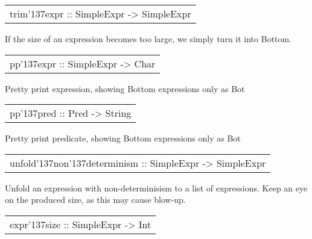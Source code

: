 \begin{haddockdesc}
\item[\begin{tabular}{@{}l}
trim{\char '137}expr :: SimpleExpr -> SimpleExpr
\end{tabular}]
{\haddockbegindoc
If the size of an expression becomes too large, we simply turn it into Bottom.\par}
\end{haddockdesc}
\begin{haddockdesc}
\item[\begin{tabular}{@{}l}
pp{\char '137}expr :: SimpleExpr -> {\char 91}Char{\char 93}
\end{tabular}]
{\haddockbegindoc
Pretty print expression, showing Bottom expressions only as Bot\par}
\end{haddockdesc}
\begin{haddockdesc}
\item[\begin{tabular}{@{}l}
pp{\char '137}pred :: Pred -> String
\end{tabular}]
{\haddockbegindoc
Pretty print predicate, showing Bottom expressions only as Bot\par}
\end{haddockdesc}
\begin{haddockdesc}
\item[\begin{tabular}{@{}l}
unfold{\char '137}non{\char '137}determinism :: SimpleExpr -> {\char 91}SimpleExpr{\char 93}
\end{tabular}]
{\haddockbegindoc
Unfold an expression with non-determinisism to a list of expressions.
 Keep an eye on the produced size, as this may cause blow-up.\par}
\end{haddockdesc}
\begin{haddockdesc}
\item[\begin{tabular}{@{}l}
expr{\char '137}size :: SimpleExpr -> Int
\end{tabular}]
{\haddockbegindoc
}
\end{haddockdesc}